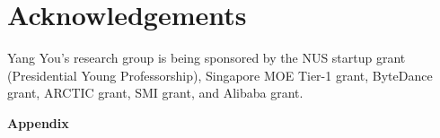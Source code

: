\documentclass[10pt,twocolumn,letterpaper]{article}
\begin{document}







\section*{Acknowledgements}

Yang You's research group is being sponsored by the NUS startup grant (Presidential Young Professorship), Singapore MOE Tier-1 grant, ByteDance grant, ARCTIC grant, SMI grant, and Alibaba grant.

{\small


}

\clearpage
\appendix
\noindent\textbf{\Large Appendix}

\clearpage
\clearpage
\end{document}
